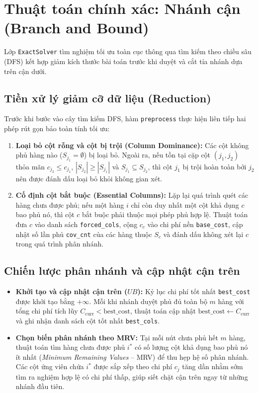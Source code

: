 \documentclass[11pt, a4paper]{article}
\begin{document}
\section{Thuật toán chính xác: Nhánh cận (Branch and Bound)}

Lớp \texttt{ExactSolver} tìm nghiệm tối ưu toàn cục thông qua tìm kiếm theo chiều sâu (DFS) kết hợp giảm kích thước bài toán trước khi duyệt và cắt tỉa nhánh dựa trên cận dưới.

\subsection{Tiền xử lý giảm cỡ dữ liệu (Reduction)}
Trước khi bước vào cây tìm kiếm DFS, hàm \texttt{preprocess} thực hiện liên tiếp hai phép rút gọn bảo toàn tính tối ưu:
\begin{enumerate}
    \item \textbf{Loại bỏ cột rỗng và cột bị trội (Column Dominance):} Các cột không phủ hàng nào ($S_{j_1} = \emptyset$) bị loại bỏ. Ngoài ra, nếu tồn tại cặp cột $(j_1, j_2)$ thỏa mãn $c_{j_2} \le c_{j_1}$, $|S_{j_2}| \ge |S_{j_1}|$ và $S_{j_1} \subseteq S_{j_2}$, thì cột $j_1$ bị trội hoàn toàn bởi $j_2$ nên được đánh dấu loại bỏ khỏi không gian xét.
    \item \textbf{Cố định cột bắt buộc (Essential Columns):} Lặp lại quá trình quét các hàng chưa được phủ; nếu một hàng $i$ chỉ còn duy nhất một cột khả dụng $c$ bao phủ nó, thì cột $c$ bắt buộc phải thuộc mọi phép phủ hợp lệ. Thuật toán đưa $c$ vào danh sách \texttt{forced\_cols}, cộng $c_c$ vào chi phí nền \texttt{base\_cost}, cập nhật số lần phủ \texttt{cov\_cnt} của các hàng thuộc $S_c$ và đánh dấu không xét lại $c$ trong quá trình phân nhánh.
\end{enumerate}

\subsection{Chiến lược phân nhánh và cập nhật cận trên}
\begin{itemize}
    \item \textbf{Khởi tạo và cập nhật cận trên ($UB$):} Kỷ lục chi phí tốt nhất \texttt{best\_cost} được khởi tạo bằng $+\infty$. Mỗi khi nhánh duyệt phủ đủ toàn bộ $m$ hàng với tổng chi phí tích lũy $C_{\text{curr}} < \text{best\_cost}$, thuật toán cập nhật $\text{best\_cost} \leftarrow C_{\text{curr}}$ và ghi nhận danh sách cột tốt nhất \texttt{best\_cols}.
    \item \textbf{Chọn biến phân nhánh theo MRV:} Tại mỗi nút chưa phủ hết $m$ hàng, thuật toán tìm hàng chưa được phủ $i^*$ có số lượng cột khả dụng bao phủ nó ít nhất (\textit{Minimum Remaining Values} -- MRV) để thu hẹp hệ số phân nhánh. Các cột ứng viên chứa $i^*$ được sắp xếp theo chi phí $c_j$ tăng dần nhằm sớm tìm ra nghiệm hợp lệ có chi phí thấp, giúp siết chặt cận trên ngay từ những nhánh đầu tiên.
\end{itemize}
\end{document}
